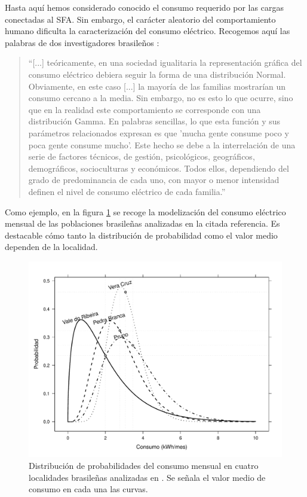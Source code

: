 Hasta aquí hemos considerado conocido el consumo requerido por las
cargas conectadas al SFA. Sin embargo, el carácter aleatorio del comportamiento
humano dificulta la caracterización del consumo eléctrico. Recogemos
aquí las palabras de dos investigadores brasileños \citep{Morante.Zilles2008}:
\begin{quotation}
{}``{[}...{]} teóricamente, en una sociedad igualitaria la representación
gráfica del consumo eléctrico debiera seguir la forma de una distribución
Normal. Obviamente, en este caso {[}...{]} la mayoría de las familias
mostrarían un consumo cercano a la media. Sin embargo, no es esto
lo que ocurre, sino que en la realidad este comportamiento se corresponde
con una distribución Gamma. En palabras sencillas, lo que esta función
y sus parámetros relacionados expresan es que 'mucha gente consume
poco y poca gente consume mucho'. Este hecho se debe a la interrelación
de una serie de factores técnicos, de gestión, psicológicos, geográficos,
demográficos, socioculturas y económicos. Todos ellos, dependiendo
del grado de predominancia de cada uno, con mayor o menor intensidad
definen el nivel de consumo eléctrico de cada familia.''
\end{quotation}
Como ejemplo, en la figura \ref{fig:Distribucion-de-probabilidades}
se recoge la modelización del consumo eléctrico mensual de las poblaciones
brasileñas analizadas en la citada referencia. Es destacable cómo
tanto la distribución de probabilidad como el valor medio dependen
de la localidad. 

%
\begin{figure}
\includegraphics[scale=0.6]{../figs/ConsumoGamma}

\caption[Distribución de probabilidades del consumo mensual en cuatro localidades
brasileñas]{\label{fig:Distribucion-de-probabilidades}Distribución de probabilidades
del consumo mensual en cuatro localidades brasileñas analizadas en
\citep{Morante.Zilles2008}. Se señala el valor medio de consumo en
cada una las curvas. }



\end{figure}


